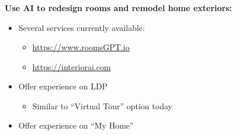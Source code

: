 \documentclass[t,xcolor={dvipsnames}]{beamer} %
\begin{document}
\begin{frame}

\frametitle{\insertsection}
  \textbf{Use AI to redesign rooms and remodel home exteriors:}
\vspace{0.2cm}

\begin{itemize}
  \item<1-> Several services currently available:
    \begin{itemize}
      \item<2->\url{https://www.roomsGPT.io}
      \item<2->\url{https://interiorai.com}
    \end{itemize}

    \item<3-> Offer experience on LDP
      \begin{itemize}
        \item<4->[$\hookrightarrow$] Similar to ``Virtual Tour'' option today
      \end{itemize}

    \item<5-> Offer experience on ``My Home''

  \end{itemize}

\end{frame}
\end{document}
